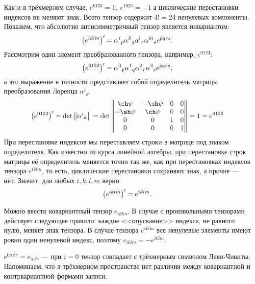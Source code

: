 \begin{enumerate}
                Как и в трёхмерном случае, $e^{0123} = 1, \: e^{1023} = -1$ а циклические перестановки индексов не меняют знак. Всего
                тензор содержит $4! = 24$ ненулевых компоненты. Покажем, что абсолютно антисимметричный тензор является инвариантом:
                \[
                    \left({e^{iklm}}\right)' = {\alpha^i}_p {\alpha^k}_q {\alpha^l}_r {\alpha^m}_s e^{pqrs}.
                \]
                Рассмотрим один элемент преобразованного тензора, например, $e^{0123}$:
                \[
                    \left({e^{0123}}\right)' = {\alpha^0}_p {\alpha^1}_q {\alpha^2}_r {\alpha^3}_s e^{pqrs},
                \]
                а это выражение в точности представляет собой определитель матрицы преобразования Лоренца ${\alpha^i}_k$:
                \[
                    \brackets{e^{0123}}' = \det\begin{Vmatrix}
                        {\alpha^i}_k
                    \end{Vmatrix} = \det\begin{Vmatrix}
                        \ch\psi & -\sh\psi & 0 & 0\\
                        -\sh\psi & \ch\psi & 0 & 0 \\
                        0 & 0 & 1 & 0 \\
                        0 & 0 & 0 & 1
                    \end{Vmatrix} = 1 = e^{0123}
                \]
                При перестановке индексов мы переставляем строки в матрице под знаком определителя. Как известно из курса линейной алгебры, при перестановке строк
                матрицы её определитель меняется точно так же, как при перестановках индексов тензора $e^{iklm}$, то есть, циклические перестановки сохраняют знак, а прочие --- нет.
                Значит, для любых $i, k, l, m$ верно
                \[
                    \left({e^{iklm}}\right)' = e^{iklm}.
                \]
                \begin{note}
                    Можно ввести ковариантный тензор $e_{iklm}$. В случае с произвольными тензорами действует следующее правило: каждое <<опускание>> индекса, не равного нулю,
                    меняет знак тензора. В случае тензора $e^{iklm}$ все ненулевые элементы имеют ровно один ненулевой индекс, поэтому $e_{iklm} = -e^{iklm}$.
                \end{note}
                \begin{note}
                    $e^{0\alpha\beta\gamma} = e_{\alpha\beta\gamma}$ --- при $i=0$ тензор совпадает с трёхмерным символом Леви-Чивиты.
                    Напоминаем, что в трёхмерном пространстве нет различия между ковариантной и контрвариантной формами записи.
                \end{note}
    \end{enumerate}

